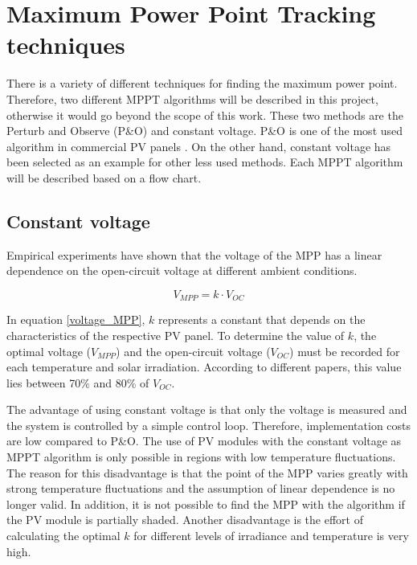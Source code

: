 \section{Maximum Power Point Tracking techniques\label{MPPTalgo}}

There is a variety of different techniques for finding the maximum power point. Therefore, two different MPPT algorithms will be described in this project, otherwise it would go beyond the scope of this work. These two methods are the Perturb and Observe (P\&O) and constant voltage. P\&O is one of the most used algorithm in commercial PV panels \cite{Dezso}. On the other hand, constant voltage has been selected as an example for other less used methods. Each MPPT algorithm will be described based on a flow chart. 

\subsection{Constant voltage}
Empirical experiments have shown that the voltage of the MPP has a linear dependence on the open-circuit voltage at different ambient conditions\cite{flowchartVC}.

\begin{equation} \label{voltage_MPP}
V_{MPP} = k \cdot V_{OC}	
\end{equation} 

In equation \ref{voltage_MPP}, $k$ represents a constant that depends on the characteristics of the respective PV panel. To determine the value of $k$, the optimal voltage ($V_{MPP}$) and the open-circuit voltage ($V_{OC}$) must be recorded for each temperature and solar irradiation. According to different papers, this value lies between 70\% and 80\% of $V_{OC}$\cite{MPPTResearch}.


The advantage of using constant voltage is that only the voltage is measured and the system is controlled by a simple control loop. Therefore, implementation costs are low compared to P\&O. The use of PV modules with the constant voltage as MPPT algorithm is only possible in regions with low temperature fluctuations. The reason for this disadvantage is that the point of the MPP varies greatly with strong temperature fluctuations and the assumption of linear dependence is no longer valid. In addition, it is not possible to find the MPP with the algorithm if the PV module is partially shaded. Another disadvantage is the effort of calculating the optimal $k$ for different levels of irradiance and temperature is very high.\cite{flowchartVC}


